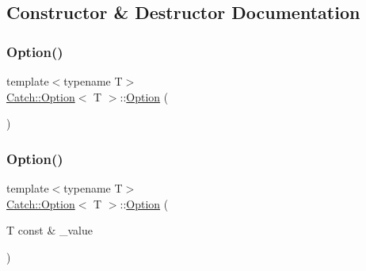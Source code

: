 \subsection{Constructor \& Destructor Documentation}
\mbox{\label{class_catch_1_1_option_a8efb01b593d798decc80cbbdf311f2a3}} 
\subsubsection{\texorpdfstring{Option()}{Option()}\hspace{0.1cm}{\footnotesize\ttfamily [1/3]}}
{\footnotesize\ttfamily template$<$typename T$>$ \\
\hyperlink{class_catch_1_1_option}{Catch\+::\+Option}$<$ T $>$\+::\hyperlink{class_catch_1_1_option}{Option} (\begin{DoxyParamCaption}{ }\end{DoxyParamCaption})\hspace{0.3cm}{\ttfamily [inline]}}

\mbox{\label{class_catch_1_1_option_a5aeb9c22d48a6882bdf5fb4730b06c86}} 
\subsubsection{\texorpdfstring{Option()}{Option()}\hspace{0.1cm}{\footnotesize\ttfamily [2/3]}}
{\footnotesize\ttfamily template$<$typename T$>$ \\
\hyperlink{class_catch_1_1_option}{Catch\+::\+Option}$<$ T $>$\+::\hyperlink{class_catch_1_1_option}{Option} (\begin{DoxyParamCaption}\item[{T const \&}]{\+\_\+value }\end{DoxyParamCaption})\hspace{0.3cm}{\ttfamily [inline]}}

\mbox{\label{class_catch_1_1_option_af02f2e4559f06384baec0def8c68c5fd}} 
